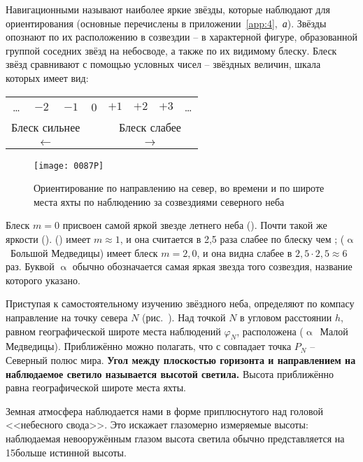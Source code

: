Навигационными называют наиболее яркие звёзды, которые наблюдают для
ориентирования (основные перечислены в
приложении~\ref{app:4},~\textit{а}). Звёзды опознают по их
расположению в созвездии \--- в характерной фигуре, образованной
группой соседних звёзд на небосводе, а также по их видимому блеску.
Блеск звёзд сравнивают с помощью условных чисел \--- звёздных величин,
шкала которых имеет вид:

\begin{center}
  \small
  \begin{tabular}[c]{cccccccc}
    \ldots & $-2$ & $-1$ & 0 & $+1$ & $+2$ & $+3$ & \ldots \\
    \multicolumn{3}{c}{Блеск сильнее} & & \multicolumn{4}{c}{Блеск слабее} \\
    \multicolumn{3}{c}{$\longleftarrow$} & & \multicolumn{4}{c}{$\longrightarrow$} 
  \end{tabular}
\end{center}

\begin{figure*}[!htb]
  \centering{}
  \texttt{[image: 0087P]}
  \caption{Ориентирование по направлению на север, во времени и по
    широте места яхты по наблюдению за созвездиями северного неба}
  \label{fig:87}
\end{figure*}

Блеск $m=0$ присвоен самой яркой звезде летнего неба 
(). Почти такой же яркости 
().  () имеет
$m \approx 1$, и она считается в 2,5 раза слабее по блеску чем
;  ($\upalpha$~Большой Медведицы) имеет
блеск $m = 2,0$, и она видна слабее  в
$2,5 \cdot 2,5 \approx 6$ раз. Буквой $\upalpha$ обычно обозначается
самая яркая звезда того созвездия, название которого указано.

Приступая к самостоятельному изучению звёздного неба, определяют по
компасу направление на точку севера $N$ (рис.~). Над точкой
$N$ в угловом расстоянии $h$, равном географической широте места
наблюдений $\varphi_N$, расположена 
($\upalpha$~Малой Медведицы). Приближённо можно полагать, что с
 совпадает точка $P_N$ \--- Северный полюс
мира. \textbf{Угол между плоскостью горизонта и направлением на
  наблюдаемое светило называется высотой светила.}%
Высота  приближённо равна географической
широте места яхты.

Земная атмосфера наблюдается нами в форме приплюснутого над головой
<<небесного свода>>. Это искажает глазомерно измеряемые высоты:
наблюдаемая невооружённым глазом высота светила обычно представляется
на 15\gr больше истинной высоты.

